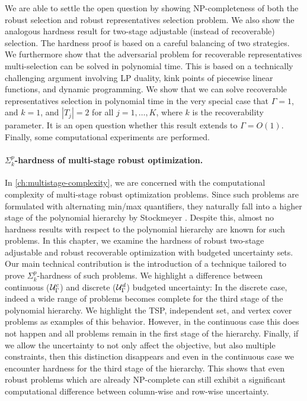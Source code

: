 We are able to settle the open question by showing NP-completeness of both the robust selection and robust representatives selection problem. We also show the  analogous hardness result for two-stage adjustable (instead of recoverable) selection.
The hardness proof is based on a careful balancing of two strategies. We furthermore show that the adversarial problem for recoverable representatives multi-selection can be solved in polynomial time. This is based on a technically challenging argument involving LP duality, kink points of piecewise linear functions, and dynamic programming.
We show that we can solve recoverable representatives selection in polynomial time in the very special case that $\Gamma = 1$, and $k = 1$, and $|T_j| = 2$ for all $j=1,\dots,K$, where $k$ is the recoverability parameter. It is an open question whether this result extends to $\Gamma  = O(1)$. Finally, some computational experiments are performed.
 
\paragraph*{$\Sigma^p_k$-hardness of multi-stage robust optimization.}
In \cref{ch:multistage-complexity}, we are concerned with the computational complexity of multi-stage robust optimization problems. Since such problems are formulated with alternating min/max quantifiers, they naturally fall into a higher stage of the polynomial hierarchy by Stockmeyer \cite{stockmeyer1976polynomial}. Despite this, almost no hardness results with respect to the polynomial hierarchy are known for such problems. In this chapter, we examine the hardness of robust two-stage adjustable and robust recoverable optimization with budgeted uncertainty sets. Our main technical contribution is the introduction of a technique tailored to prove $\Sigma^p_k$-hardness of such problems. We highlight a difference between continuous ($\mathcal{U}^c_\Gamma$) and discrete ($\mathcal{U}^d_\Gamma$) budgeted uncertainty: In the discrete case, indeed a wide range of problems becomes complete for the third stage of the polynomial hierarchy. We highlight the TSP, independent set, and vertex cover problems as examples of this behavior. However, in the continuous case this does not happen and all problems remain in the first stage of the hierarchy. Finally, if we allow the uncertainty to not only affect the objective, but also multiple constraints, then this distinction disappears and even in the continuous case we encounter hardness for the third stage of the hierarchy. This shows that even robust problems which are already NP-complete can still exhibit a significant computational difference between column-wise and row-wise uncertainty.

